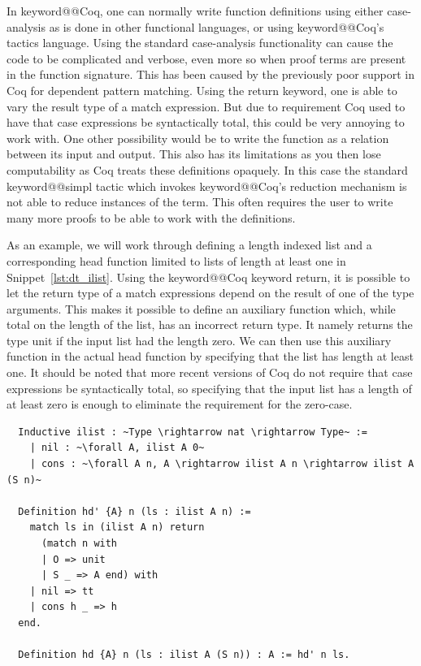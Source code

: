 \documentclass[11pt, final]{article}
\makeatletter
\def\<#1>{\csname keyword@@#1\endcsname}
\makeatother
\begin{document}
In \<Coq>, one can normally write function definitions using either case-analysis as is done in other functional languages, or using \<Coq>'s tactics language.
Using the standard case-analysis functionality can cause the code to be complicated and verbose, even more so when proof terms are present in the function signature.
This has been caused by the previously poor support in Coq for dependent pattern matching.
Using the return keyword, one is able to vary the result type of a match expression. But due to requirement Coq used to have that case expressions be syntactically total, this could be very annoying to work with.
One other possibility would be to write the function as a relation between its input and output.
This also has its limitations as you then lose computability as Coq treats these definitions opaquely. In this case the standard \<simpl> tactic which invokes \<Coq>'s reduction mechanism is not able to reduce instances of the term.
This often requires the user to write many more proofs to be able to work with the definitions.

As an example, we will work through defining a length indexed list and a corresponding head function limited to lists of length at least one in Snippet~\ref{lst:dt_ilist}.
Using the \<Coq> keyword return, it is possible to let the return type of a match expressions depend on the result of one of the type arguments.
This makes it possible to define an auxiliary function which, while total on the length of the list, has an incorrect return type. It namely returns the type unit if the input list had the length zero.
We can then use this auxiliary function in the actual head function by specifying that the list has length at least one.
It should be noted that more recent versions of Coq do not require that case expressions be syntactically total, so specifying that the input list has a length of at least zero is enough to eliminate the requirement for the zero-case.

\begin{listing}
  \begin{verbatim}
  Inductive ilist : ~Type \rightarrow nat \rightarrow Type~ :=
    | nil : ~\forall A, ilist A 0~
    | cons : ~\forall A n, A \rightarrow ilist A n \rightarrow ilist A (S n)~

  Definition hd' {A} n (ls : ilist A n) :=
    match ls in (ilist A n) return
      (match n with
      | O => unit
      | S _ => A end) with
    | nil => tt
    | cons h _ => h
  end.

  Definition hd {A} n (ls : ilist A (S n)) : A := hd' n ls.
  \end{verbatim}
  \caption{Definition of a length indexed list and hd using the return keyword, adapted from Certified Programming with Dependent Types\cite{ChlipalaCPDT}.}
  \label{lst:dt_ilist}
\end{listing}
\end{document}

